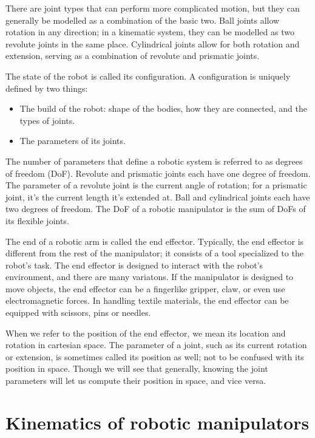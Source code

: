 There are joint types that can perform more complicated motion, but they can generally be modelled as a combination of the basic two. Ball joints allow rotation in any direction; in a kinematic system, they can be modelled as two revolute joints in the same place. Cylindrical joints allow for both rotation and extension, serving as a combination of revolute and prismatic joints.

The state of the robot is called its configuration. A configuration is uniquely defined by two things:
\begin{itemize}
  \item The build of the robot: shape of the bodies, how they are connected, and the types of joints.
  \item The parameters of its joints.
\end{itemize}

The number of parameters that define a robotic system is referred to as degrees of freedom (DoF). Revolute and prismatic joints each have one degree of freedom. The parameter of a revolute joint is the current angle of rotation; for a prismatic joint, it's the current length it's extended at. Ball and cylindrical joints each have two degrees of freedom. The DoF of a robotic manipulator is the sum of DoFs of its flexible joints.

The end of a robotic arm is called the end effector. Typically, the end effector is different from the rest of the manipulator; it consists of a tool specialized to the robot's task. The end effector is designed to interact with the robot's environment, and there are many variatons. If the manipulator is designed to move objects, the end effector can be a fingerlike gripper, claw, or even use electromagnetic forces\cite{grippers}. In handling textile materials, the end effector can be equipped with scissors, pins or needles.

When we refer to the position of the end effector, we mean its location and rotation in cartesian space. The parameter of a joint, such as its current rotation or extension, is sometimes called its position as well; not to be confused with its position in space. Though we will see that generally, knowing the joint parameters will let us compute their position in space, and vice versa.

\section{Kinematics of robotic manipulators}

